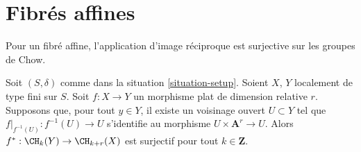 \section{Fibrés affines}
\label{section-affine-vector}

\noindent
Pour un fibré affine, l'application d'image réciproque est surjective sur les groupes de Chow.

\begin{lemma}
\label{lemma-pullback-affine-fibres-surjective}
Soit $(S, \delta)$ comme dans la situation \ref{situation-setup}.
Soient $X$, $Y$ localement de type fini sur $S$.
Soit $f : X \to Y$ un morphisme plat de dimension relative $r$.
Supposons que, pour tout $y \in Y$, il existe un voisinage ouvert
$U \subset Y$ tel que $f|_{f^{-1}(U)} : f^{-1}(U) \to U$
s'identifie au morphisme $U \times \mathbf{A}^r \to U$.
Alors $f^* : \CH_k(Y) \to \CH_{k + r}(X)$ est surjectif pour tout
$k \in \mathbf{Z}$.
\end{lemma}

